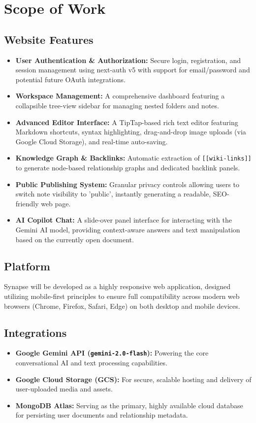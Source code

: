 \documentclass[12pt, a4paper]{article}
\begin{document}
\section{Scope of Work}

\subsection{Website Features}
\begin{itemize}[leftmargin=2em]
    \item \textbf{User Authentication \& Authorization:} Secure login, registration, and session management using next-auth v5 with support for email/password and potential future OAuth integrations.
    \item \textbf{Workspace Management:} A comprehensive dashboard featuring a collapsible tree-view sidebar for managing nested folders and notes.
    \item \textbf{Advanced Editor Interface:} A TipTap-based rich text editor featuring Markdown shortcuts, syntax highlighting, drag-and-drop image uploads (via Google Cloud Storage), and real-time auto-saving.
    \item \textbf{Knowledge Graph \& Backlinks:} Automatic extraction of \texttt{[[wiki-links]]} to generate node-based relationship graphs and dedicated backlink panels.
    \item \textbf{Public Publishing System:} Granular privacy controls allowing users to switch note visibility to 'public', instantly generating a readable, SEO-friendly web page.
    \item \textbf{AI Copilot Chat:} A slide-over panel interface for interacting with the Gemini AI model, providing context-aware answers and text manipulation based on the currently open document.
\end{itemize}

\subsection{Platform}
Synapse will be developed as a highly responsive web application, designed utilizing mobile-first principles to ensure full compatibility across modern web browsers (Chrome, Firefox, Safari, Edge) on both desktop and mobile devices.

\subsection{Integrations}
\begin{itemize}[leftmargin=2em]
    \item \textbf{Google Gemini API (\texttt{gemini-2.0-flash}):} Powering the core conversational AI and text processing capabilities.
    \item \textbf{Google Cloud Storage (GCS):} For secure, scalable hosting and delivery of user-uploaded media and assets.
    \item \textbf{MongoDB Atlas:} Serving as the primary, highly available cloud database for persisting user documents and relationship metadata.
\end{itemize}
\end{document}
